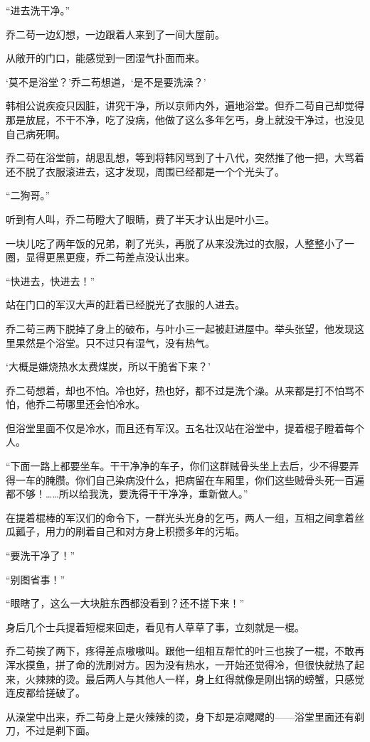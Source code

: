 “进去洗干净。”

乔二苟一边幻想，一边跟着人来到了一间大屋前。

从敞开的门口，能感觉到一团湿气扑面而来。

‘莫不是浴堂？’乔二苟想道，‘是不是要洗澡？’

韩相公说疾疫只因脏，讲究干净，所以京师内外，遍地浴堂。但乔二苟自己却觉得那是放屁，不干不净，吃了没病，他做了这么多年乞丐，身上就没干净过，也没见自己病死啊。

乔二苟在浴堂前，胡思乱想，等到将韩冈骂到了十八代，突然推了他一把，大骂着还不脱了衣服滚进去，这才发现，周围已经都是一个个光头了。

“二狗哥。”

听到有人叫，乔二苟瞪大了眼睛，费了半天才认出是叶小三。

一块儿吃了两年饭的兄弟，剃了光头，再脱了从来没洗过的衣服，人整整小了一圈，显得更黑更瘦，乔二苟差点没认出来。

“快进去，快进去！”

站在门口的军汉大声的赶着已经脱光了衣服的人进去。

乔二苟三两下脱掉了身上的破布，与叶小三一起被赶进屋中。举头张望，他发现这里果然是个浴堂。只不过只有湿气，没有热气。

‘大概是嫌烧热水太费煤炭，所以干脆省下来？’

乔二苟想着，却也不怕。冷也好，热也好，都不过是洗个澡。从来都是打不怕骂不怕，他乔二苟哪里还会怕冷水。

但浴堂里面不仅是冷水，而且还有军汉。五名壮汉站在浴堂中，提着棍子瞪着每个人。

“下面一路上都要坐车。干干净净的车子，你们这群贼骨头坐上去后，少不得要弄得一车的腌臜。你们自己染病没什么，把病留在车厢里，你们这些贼骨头死一百遍都不够！……所以给我洗，要洗得干干净净，重新做人。”

在提着棍棒的军汉们的命令下，一群光头光身的乞丐，两人一组，互相之间拿着丝瓜瓤子，用力的刷着自己和对方身上积攒多年的污垢。

“要洗干净了！”

“别图省事！”

“眼瞎了，这么一大块脏东西都没看到？还不搓下来！”

身后几个士兵提着短棍来回走，看见有人草草了事，立刻就是一棍。

乔二苟挨了两下，疼得差点嗷嗷叫。跟他一组相互帮忙的叶三也挨了一棍，不敢再浑水摸鱼，拼了命的洗刷对方。因为没有热水，一开始还觉得冷，但很快就热了起来，火辣辣的烫。最后两人与其他人一样，身上红得就像是刚出锅的螃蟹，只感觉连皮都给搓破了。

从澡堂中出来，乔二苟身上是火辣辣的烫，身下却是凉飕飕的——浴堂里面还有剃刀，不过是剃下面。

